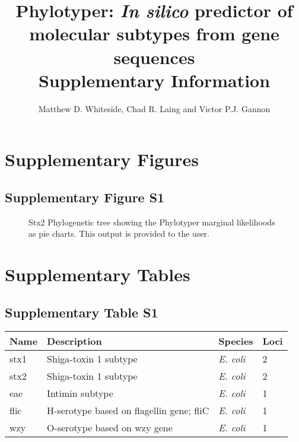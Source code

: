 \documentclass[12pt,letterpaper]{article}
\title{Phylotyper: {\it In silico} predictor of molecular subtypes from gene sequences \\ \large Supplementary Information}
\author{Matthew D. Whiteside, Chad R. Laing and Victor P.J. Gannon}
\date{ }
\begin{document}
 
\maketitle
 
\tableofcontents

\section{Supplementary Figures}

\subsection{Supplementary Figure S1}

\begin{figure}[h!]
\centering
\caption{Stx2 Phylogenetic tree showing the Phylotyper marginal likelihoods as pie charts. This output is provided to the user.}
\end{figure}

\section{Supplementary Tables}

\subsection{Supplementary Table S1}

\begin{minipage}{\linewidth}
\medskip
\begin{tabular}{@{}llll@{}}\toprule Name &
Description & Species & Loci\\\midrule
stx1 & Shiga-toxin 1 subtype & {\it E. coli} & 2 \\
stx2 & Shiga-toxin 1 subtype & {\it E. coli} & 2\\
eae & Intimin subtype & {\it E. coli} & 1\\
flic & H-serotype based on flagellin gene; fliC & {\it E. coli} & 1\\
wzy & O-serotype based on wzy gene & {\it E. coli} & 1\\\bottomrule
\end{tabular}\par
\bigskip

\end{minipage}

\bigskip
\end{document}
